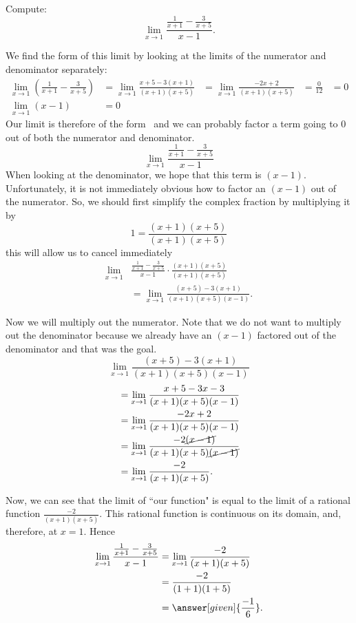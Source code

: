 \documentclass{ximera}
\begin{document}
\begin{example}
  Compute:
  \[
  \lim_{x\to 1} \frac{\frac{1}{x+1}-\frac{3}{x+5}}{x-1}.
  \]
\begin{explanation}
  We find the form of this limit by looking at the limits of the
  numerator and denominator separately:
  \begin{align*}
    \lim_{x\to 1}\left(\frac{1}{x+1}-\frac{3}{x+5}\right)&=  \lim_{x\to 1}\frac{x+5-3(x+1)}{(x+1)(x+5)}&= \lim_{x\to 1}\frac{-2x+2}{(x+1)(x+5)}&= \frac{0}{12}&=0\\
    \lim_{x\to 1}\left(x-1\right)&=0
  \end{align*}
  Our limit is therefore of the form \zeroOverZero\ and we can
  probably factor a term going to $0$ out of both the numerator and
  denominator.
  \[
  \lim_{x\to 1} \frac{\frac{1}{x+1}-\frac{3}{x+5}}{x-1}
  \]
  When looking at the denominator, we hope that this
  term is $(x-1)$.  Unfortunately, it is not immediately obvious how to
  factor an $(x-1)$ out of the numerator. So, we should first simplify the complex fraction
  by multiplying it by
  \[
  1 = \frac{(x+1)(x+5)}{(x+1)(x+5)}
  \]
  this will allow us to cancel immediately
\begin{align*}
  \lim_{x\to 1}& \frac{\frac{1}{x+1}-\frac{3}{x+5}}{x-1}  \cdot \frac{(x+1)(x+5)}{(x+1)(x+5)} \\
  &= \lim_{x\to 1}\frac{(x+5)-3(x+1)}{(x+1)(x+5)(x-1)}.
\end{align*}

Now we will multiply out the numerator.  Note that we do not want to
multiply out the denominator because we already have an $(x-1)$
factored out of the denominator and that was the goal.
\[
\lim_{x\to 1}\frac{(x+5)-3(x+1)}{(x+1)(x+5)(x-1)}
\]
\begin{align*}
  &= \lim_{x\to 1}\frac{x+5-3x-3}{(x+1)(x+5)(x-1)} \\
  &= \lim_{x\to 1}\frac{-2x+2}{(x+1)(x+5)(x-1)}\\
  &= \lim_{x\to 1}\frac{-2\cancel{(x-1)}}{(x+1)(x+5)\cancel{(x-1)}}\\
  &= \lim_{x\to 1}\frac{-2}{(x+1)(x+5)}.
\end{align*}

Now, we can see that the limit of ``our function" is equal to the limit of a rational function $\frac{-2}{(x+1)(x+5)}$. This rational function is continuous on its domain, and, therefore, at $x=1$.  Hence
\begin{align*}
\lim_{x\to 1} \frac{\frac{1}{x+1}-\frac{3}{x+5}}{x-1}&=\lim_{x\to
  1}\frac{-2}{(x+1)(x+5)}\\
&= \frac{-2}{(1+1)(1+5)} \\
&=\answer[given]{\frac{-1}{6}}.
\end{align*}
\end{explanation}
\end{example}
\end{document}
